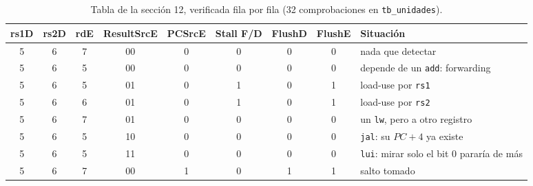 \documentclass[11pt,letterpaper]{article}
\newcommand{\cod}[1]{\texttt{#1}}
\begin{document}
\begin{table}[!htbp]
\centering\footnotesize\setlength{\tabcolsep}{3.5pt}
\begin{tabular}{@{}c c c c c c c c l@{}}
\toprule
\textbf{rs1D} & \textbf{rs2D} & \textbf{rdE} & \textbf{ResultSrcE} & \textbf{PCSrcE} &
\textbf{Stall F/D} & \textbf{FlushD} & \textbf{FlushE} & \textbf{Situaci\'on} \\
\midrule
5 & 6 & 7 & 00 & 0 & 0 & 0 & 0 & nada que detectar \\
5 & 6 & 5 & 00 & 0 & 0 & 0 & 0 & depende de un \cod{add}: forwarding \\
5 & 6 & 5 & 01 & 0 & 1 & 0 & 1 & load-use por \cod{rs1} \\
5 & 6 & 6 & 01 & 0 & 1 & 0 & 1 & load-use por \cod{rs2} \\
5 & 6 & 7 & 01 & 0 & 0 & 0 & 0 & un \cod{lw}, pero a otro registro \\
5 & 6 & 5 & 10 & 0 & 0 & 0 & 0 & \cod{jal}: su $PC+4$ ya existe \\
5 & 6 & 5 & 11 & 0 & 0 & 0 & 0 & \cod{lui}: mirar solo el bit 0 parar\'ia de m\'as \\
5 & 6 & 7 & 00 & 1 & 0 & 1 & 1 & salto tomado \\
\bottomrule
\end{tabular}
\caption{Tabla de la secci\'on 12, verificada fila por fila (32 comprobaciones en \cod{tb\_unidades}).}
\end{table}
\end{document}
